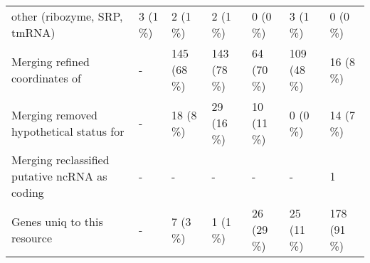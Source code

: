 {\begin{tabular}{lllllll}
\hspace{1em}other (ribozyme, SRP, tmRNA) & 3 (1 \%) & 2 (1 \%) & 2 (1 \%) & 0 (0 \%) & 3 (1 \%) & 0 (0 \%)\\
Merging refined coordinates of & - & 145 (68 \%) & 143 (78 \%) & 64 (70 \%) & 109 (48 \%) & 16 (8 \%)\\
Merging removed hypothetical status for & - & 18 (8 \%) & 29 (16 \%) & 10 (11 \%) & 0 (0 \%) & 14 (7 \%)\\
Merging reclassified putative ncRNA as coding & - & - & - & - & - & 1\\
Genes uniq to this resource & - & 7 (3 \%) & 1 (1 \%) & 26 (29 \%) & 25 (11 \%) & 178 (91 \%)\\
\bottomrule
\end{tabular}}
